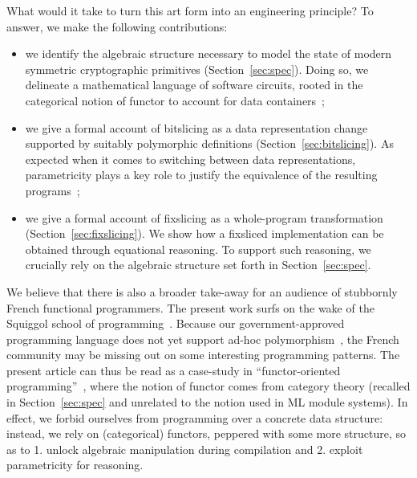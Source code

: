 \documentclass[draft,english]{jflart}
\begin{document}

What would it take to turn this art form into an engineering
principle? To answer, we make the following contributions:
%
\begin{itemize}
\item we identify the algebraic structure necessary to model the state
  of modern symmetric cryptographic primitives
  (Section~\ref{sec:spec}). Doing so, we delineate a mathematical
  language of software circuits, rooted in the categorical notion of
  functor to account for data containers~;
\item we give a formal account of bitslicing as a data representation
  change supported by suitably polymorphic definitions
  (Section~\ref{sec:bitslicing}). As expected when it comes to
  switching between data representations, parametricity plays a key
  role to justify the equivalence of the resulting programs~;
\item we give a formal account of fixslicing as a whole-program
  transformation (Section~\ref{sec:fixslicing}). We show how a
  fixsliced implementation can be obtained through equational
  reasoning. To support such reasoning, we crucially rely on the
  algebraic structure set forth in Section~\ref{sec:spec}.
\end{itemize}


We believe that there is also a broader take-away for an audience of
stubbornly French functional programmers. The present work surfs on
the wake of the Squiggol school of programming~\citep{bird:squiggol}.
Because our government-approved programming language does not yet
support ad-hoc polymorphism~\citep{white:modular-implicit}, the French
community may be missing out on some interesting programming patterns.
The present article can thus be read as a case-study in
``functor-oriented programming''~\citep{roconnor:functor-oriented},
where the notion of functor comes from category theory (recalled in
Section~\ref{sec:spec} and unrelated to the notion used in ML module
systems). In effect, we forbid ourselves from programming over a
concrete data structure: instead, we rely on (categorical) functors,
peppered with some more structure, so as to 1. unlock algebraic
manipulation during compilation and 2. exploit parametricity for
reasoning.
\end{document}
